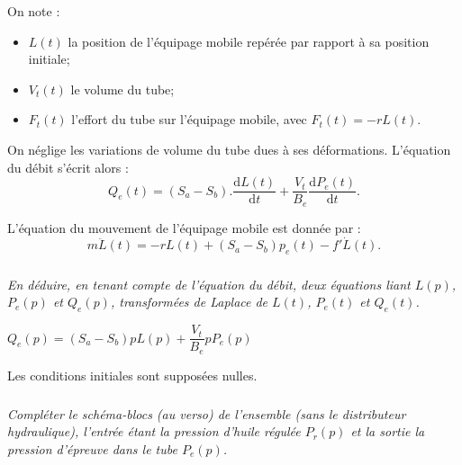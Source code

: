 \documentclass[10pt,fleqn]{article} %
\begin{document}
\begin{multicols}{2}
On note :
\begin{itemize}
	\item $L(t)$ la position de l’équipage mobile repérée par rapport à sa position initiale;
	\item $V_t(t)$ le volume du tube;
	\item $F_t(t)$ l’effort du tube sur l’équipage mobile, avec $F_t(t) = - rL(t)$.
\end{itemize}

On néglige les variations de volume du tube dues à ses déformations. L’équation du débit s’écrit alors :
	$$Q_e (t)=(S_a-S_b ).\dfrac{\text{d}L(t)}{\text{d}t}+\dfrac{V_t}{B_e}  \dfrac{\text{d}P_e (t)}{\text{d}t}.$$
	
%	


L’équation du mouvement de l’équipage mobile est donnée par : 
$$
m\ddot{L}(t)=-rL(t)+\left(S_a-S_b \right)p_e(t)-f'\dot{L}(t).
$$

\fi
\subparagraph{}
\textit{En déduire, en tenant compte de l’équation du débit, deux équations liant $L(p)$, $P_e(p)$ et $Q_e(p)$, transformées de Laplace de $L(t)$, $P_e(t)$ et $Q_e(t)$. }
\ifprof
\begin{corrige}
	$Q_e (p)=(S_a-S_b )p L(p)+\dfrac{V_t}{B_e}  p P_e(p)$
\end{corrige}
\else
\fi
Les conditions initiales sont supposées nulles.

\subparagraph{}
\textit{Compléter le schéma-blocs (au verso) de l’ensemble (sans le distributeur hydraulique), l’entrée étant la pression d’huile régulée $P_r(p)$ et la sortie la pression d’épreuve dans le tube $P_e(p)$.}
\ifprof
\begin{corrige}
\end{corrige}
\else
\fi


\end{multicols}
\end{document}
